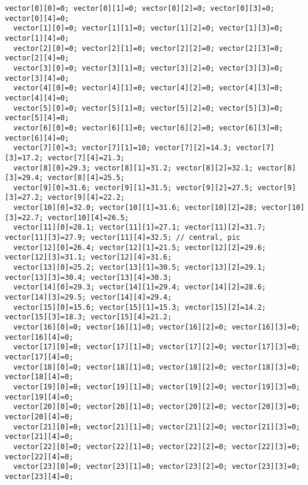 \begin{lstlisting}[style=myArduino]
  vector[0][0]=0; vector[0][1]=0; vector[0][2]=0; vector[0][3]=0; vector[0][4]=0;
  vector[1][0]=0; vector[1][1]=0; vector[1][2]=0; vector[1][3]=0; vector[1][4]=0;
  vector[2][0]=0; vector[2][1]=0; vector[2][2]=0; vector[2][3]=0; vector[2][4]=0;
  vector[3][0]=0; vector[3][1]=0; vector[3][2]=0; vector[3][3]=0; vector[3][4]=0;
  vector[4][0]=0; vector[4][1]=0; vector[4][2]=0; vector[4][3]=0; vector[4][4]=0;
  vector[5][0]=0; vector[5][1]=0; vector[5][2]=0; vector[5][3]=0; vector[5][4]=0;
  vector[6][0]=0; vector[6][1]=0; vector[6][2]=0; vector[6][3]=0; vector[6][4]=0;
  vector[7][0]=3; vector[7][1]=10; vector[7][2]=14.3; vector[7][3]=17.2; vector[7][4]=21.3;
  vector[8][0]=29.3; vector[8][1]=31.2; vector[8][2]=32.1; vector[8][3]=29.4; vector[8][4]=25.5;
  vector[9][0]=31.6; vector[9][1]=31.5; vector[9][2]=27.5; vector[9][3]=27.2; vector[9][4]=22.2;
  vector[10][0]=32.0; vector[10][1]=31.6; vector[10][2]=28; vector[10][3]=22.7; vector[10][4]=26.5;
  vector[11][0]=28.1; vector[11][1]=27.1; vector[11][2]=31.7; vector[11][3]=27.9; vector[11][4]=32.5; // central, pic
  vector[12][0]=26.4; vector[12][1]=21.5; vector[12][2]=29.6; vector[12][3]=31.1; vector[12][4]=31.6;
  vector[13][0]=25.2; vector[13][1]=30.5; vector[13][2]=29.1; vector[13][3]=30.4; vector[13][4]=30.3;
  vector[14][0]=29.3; vector[14][1]=29.4; vector[14][2]=28.6; vector[14][3]=29.5; vector[14][4]=29.4;
  vector[15][0]=15.6; vector[15][1]=15.3; vector[15][2]=14.2; vector[15][3]=18.3; vector[15][4]=21.2;
  vector[16][0]=0; vector[16][1]=0; vector[16][2]=0; vector[16][3]=0; vector[16][4]=0;
  vector[17][0]=0; vector[17][1]=0; vector[17][2]=0; vector[17][3]=0; vector[17][4]=0;
  vector[18][0]=0; vector[18][1]=0; vector[18][2]=0; vector[18][3]=0; vector[18][4]=0;
  vector[19][0]=0; vector[19][1]=0; vector[19][2]=0; vector[19][3]=0; vector[19][4]=0;
  vector[20][0]=0; vector[20][1]=0; vector[20][2]=0; vector[20][3]=0; vector[20][4]=0;
  vector[21][0]=0; vector[21][1]=0; vector[21][2]=0; vector[21][3]=0; vector[21][4]=0;
  vector[22][0]=0; vector[22][1]=0; vector[22][2]=0; vector[22][3]=0; vector[22][4]=0;
  vector[23][0]=0; vector[23][1]=0; vector[23][2]=0; vector[23][3]=0; vector[23][4]=0;


\end{lstlisting}
